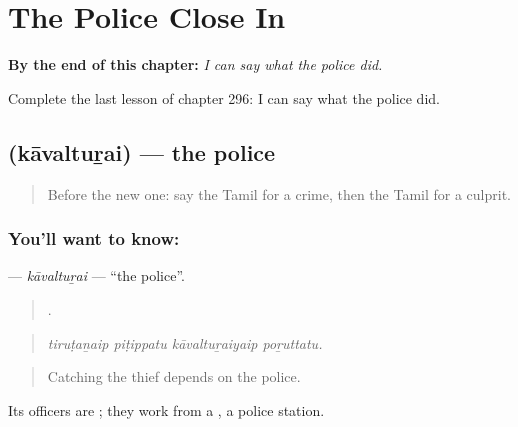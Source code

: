 
\chapter{The Police Close In}
\label{ch:ta-the-police-close-in}

\begin{chapteropening}
\textbf{By the end of this chapter:} \emph{I can say what the police did.}

Complete the last lesson of chapter 296: I can say what the police did.
\end{chapteropening}

\section[\texorpdfstring{\ta{காவல்துறை} (kāvaltuṟai)}{காவல்துறை (kāvaltuṟai)}]{ (kāvaltuṟai) — the police}

\label{lesson:TA-C296-kavalturai}



\begin{quote}
Before the new one: say the Tamil for a crime, then the Tamil for a culprit.
\end{quote}

\subsection*{You'll want to know: }
\textbf{} — \emph{kāvaltuṟai} — \textquotedblleft{}the police\textquotedblright{}.

\begin{quote}
   .
\end{quote}

\begin{quote}
\emph{tiruṭaṉaip piṭippatu kāvaltuṟaiyaip poṟuttatu.}
\end{quote}

\begin{quote}
Catching the thief depends on the police.
\end{quote}

Its officers are ; they work from a  , a police station.

